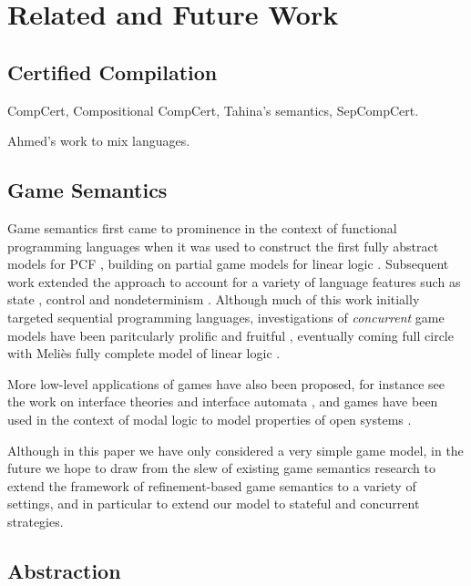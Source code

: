 \documentclass[acmsmall,timestamp,review,anonymous]{acmart}
\begin{document}


\section{Related and Future Work} %

\subsection{Certified Compilation} %

CompCert,
Compositional CompCert,
Tahina's semantics,
SepCompCert.

Ahmed's work to mix languages.


\subsection{Game Semantics} %

Game semantics first came to prominence
in the context of functional programming languages when
it was used to construct
the first fully abstract models for PCF
\cite{pcfajm,pcfho},
building on partial game models for linear logic
\cite{gsll,gsllaj}.
Subsequent work
extended the approach to account for a variety of
language features such as
state \cite{gsia},
control \cite{gscontrol} and
nondeterminism \cite{gsnondet}.
Although much of this work initially
targeted sequential programming languages,
investigations of \emph{concurrent} game models
have been paritcularly prolific and fruitful
\cite{x,y,z,gsconcur},
eventually coming full circle with Meli\`es
fully complete model of linear logic \cite{t}.

More low-level applications of games have also been proposed,
for instance see the work on interface theories
and interface automata \cite{ia,gmos,itcd,gtf},
and games have been used in the context of modal logic
to model properties of open systems
\cite{atl,altref}.

Although in this paper we have only considered a very simple game model,
in the future we hope to draw from the slew of existing game semantics research
to extend the framework of refinement-based game semantics
to a variety of settings,
and in particular to extend our model
to stateful and concurrent strategies.


\subsection{Abstraction} %
\end{document}
